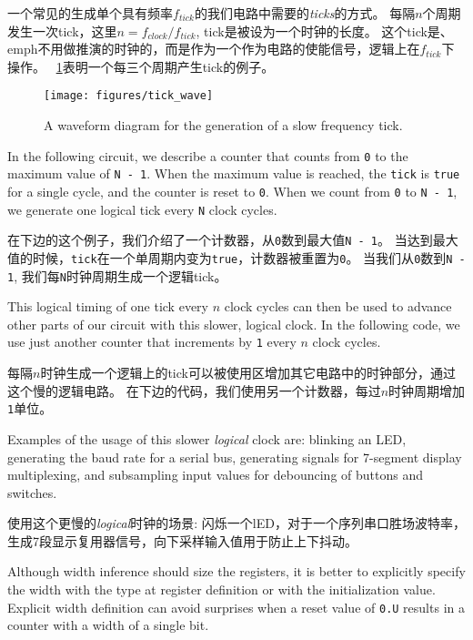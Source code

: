 \documentclass[%
    10pt,
    headinclude, footexclude,
    openright, %
    notitlepage,
    cleardoubleempty,
    headsepline,
    pointlessnumbers,
    bibtotoc, idxtotoc,
    ]{scrbook}
\newcommand{\code}[1]{{\small{\texttt{#1}}}}
\begin{document}
一个常见的生成单个具有频率$f_{tick}$的我们电路中需要的\emph{ticks}的方式。
每隔$n$个周期发生一次tick，这里$n = f_{clock}/f_{tick}$, tick是被设为一个时钟的长度。
这个tick是、emph{不}用做推演的时钟的，而是作为一个作为电路的使能信号，逻辑上在$f_{tick}$下操作。
~\ref{fig:tick-wave}表明一个每三个周期产生tick的例子。

\begin{figure}
  \centering
  \texttt{[image: figures/tick\_wave]}
  \caption{A waveform diagram for the generation of a slow frequency tick.}
  \label{fig:tick-wave}
\end{figure}

In the following circuit, we describe a counter that counts from \code{0}
to the maximum value of \code{N - 1}. When the maximum value is reached,
the \code{tick} is \code{true} for a single cycle, and the counter is reset to \code{0}.
When we count from \code{0} to \code{N - 1}, we generate one logical tick
every \code{N} clock cycles.

在下边的这个例子，我们介绍了一个计数器，从\code{0}数到最大值\code{N - 1}。
当达到最大值的时候，\code{tick}在一个单周期内变为\code{true}，计数器被重置为\code{0}。
当我们从\code{0}数到\code{N - 1}, 我们每\code{N}时钟周期生成一个逻辑tick。



\noindent This logical timing of one tick every $n$ clock cycles can then be used
to advance other parts of our circuit with this slower, logical clock.
In the following code, we use just another counter that increments by \code{1}
every $n$ clock cycles.

\noindent 每隔$n$时钟生成一个逻辑上的tick可以被使用区增加其它电路中的时钟部分，通过这个慢的逻辑电路。
在下边的代码，我们使用另一个计数器，每过$n$时钟周期增加\code{1}单位。


Examples of the usage of this slower \emph{logical} clock are: blinking an LED,
generating the baud rate for a serial bus, generating signals for 7-segment
display multiplexing, and subsampling input values for debouncing of buttons
and switches. 

使用这个更慢的\emph{logical}时钟的场景: 闪烁一个lED，对于一个序列串口胜场波特率，
生成7段显示复用器信号，向下采样输入值用于防止上下抖动。

Although width inference should size the registers, it is better to explicitly
specify the width with the type at register definition or with the
initialization value. Explicit width definition can avoid surprises when a reset value of \code{0.U}
results in a counter with a width of a single bit.
\end{document}
